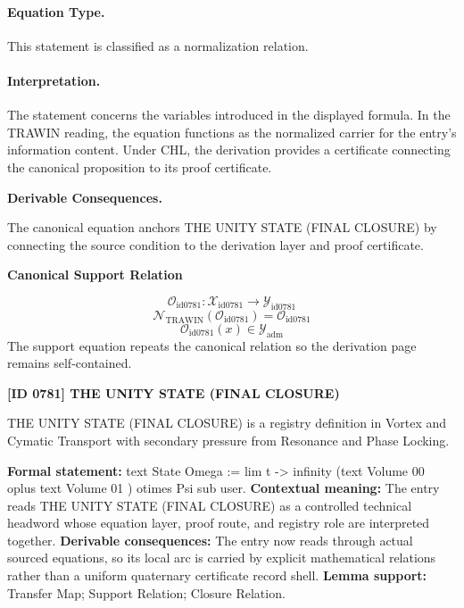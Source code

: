\paragraph{Equation Type.}
This statement is classified as a normalization relation.

\paragraph{Interpretation.}
The statement concerns the variables introduced in the displayed formula. In the TRAWIN reading, the equation functions as the normalized carrier for the entry’s information content. Under CHL, the derivation provides a certificate connecting the canonical proposition to its proof certificate.

\par\vspace{0.35em}
\noindent\textbf{Derivable Consequences.}\quad
\begingroup
\footnotesize
\raggedright
The canonical equation anchors THE UNITY STATE (FINAL CLOSURE) by connecting the source condition to the derivation layer and proof certificate.
\par\endgroup

\noindent\textbf{Canonical Support Relation}\par
\[
\mathcal{O}_{\mathrm{id0781}}:\mathcal{X}_{\mathrm{id0781}}\longrightarrow\mathcal{Y}_{\mathrm{id0781}}
\]
\[
\mathcal{N}_{\mathrm{TRAWIN}}(\mathcal{O}_{\mathrm{id0781}})=\mathcal{O}_{\mathrm{id0781}}
\]
\[
\mathcal{O}_{\mathrm{id0781}}(x)\in\mathcal{Y}_{\mathrm{adm}}
\]
\noindent The support equation repeats the canonical relation so the derivation page remains self-contained.\par

\clearpage
\noindent\textbf{[ID 0781] THE UNITY STATE (FINAL CLOSURE)}\par
\vspace{0.35em}
\begingroup\small
{}
THE UNITY STATE (FINAL CLOSURE) is a registry definition in Vortex and Cymatic Transport with secondary pressure from Resonance and Phase Locking.

\begingroup\footnotesize\setlength{\emergencystretch}{3em}\sloppy
\textbf{Formal statement:} text State Omega := lim t -> infinity (text Volume 00 oplus text Volume 01 ) otimes Psi sub user. \textbf{Contextual meaning:} The entry reads THE UNITY STATE (FINAL CLOSURE) as a controlled technical headword whose equation layer, proof route, and registry role are interpreted together. \textbf{Derivable consequences:} The entry now reads through actual sourced equations, so its local arc is carried by explicit mathematical relations rather than a uniform quaternary certificate record shell. \textbf{Lemma support:} Transfer Map; Support Relation; Closure Relation.\par
\endgroup

